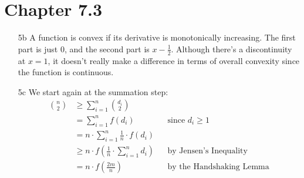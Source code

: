 \documentclass[12pt]{article}
\begin{document}
\section{Chapter 7.3}

\begin{enumerate}
    \item[5b] A function is convex if its derivative is monotonically increasing.
        The first part is just $0$, and the second part is $x-\frac{1}{2}$.
        Although there's a discontinuity at $x=1$, it doesn't really make
        a difference in terms of overall convexity since the function is continuous.

    \item[5c] We start again at the summation step:
        \begin{align*}
            \binom{n}{2}
             & \ge \sum_{i=1}^{n} \binom{d_i}{2}                                                                   \\
             & = \sum_{i=1}^{n} f(d_i)                                        &  & \text{since $d_i \ge 1$}        \\
             & = n \cdot \sum_{i=1}^{n} \frac{1}{n} \cdot f(d_i)                                                   \\
             & \ge n \cdot f\left(\frac{1}{n} \cdot \sum_{i=1}^{n} d_i\right) &  & \text{by Jensen's Inequality}   \\
             & = n \cdot f\left(\frac{2m}{n}\right)                           &  & \text{by the Handshaking Lemma}
        \end{align*}


\end{enumerate}
\end{document}
